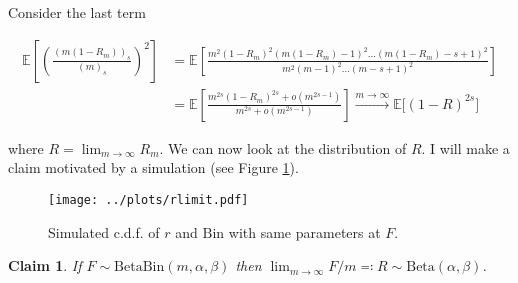 \documentclass[american, abstract=on]{scrartcl}
\theoremstyle{plain}
\newtheorem{claim}{Claim}
\newcommand{\E}{\mathbb{E}}
\newcommand{\Beta}{\text{Beta}}
\newcommand{\Bin}{\text{Bin}}
\begin{document}
Consider the last term

\begin{equation}
    \begin{split}
        \E\left[\left(\frac{(m(1- R_m))_s}{(m)_s} \right)^2\right] &= \E\left[ \frac{m^2 (1 - R_m)^2 (m (1 - R_m) - 1)^2 \ldots (m(1-R_m) - s + 1)^2}{m^2 (m - 1)^2 \ldots (m - s + 1)^2} \right] \\
        &= \E\left[\frac{m^{2s}(1- R_m)^{2s} + o(m^{2s - 1})}{m^{2s} + o(m^{2s - 1})}\right] \xrightarrow{m \rightarrow \infty} \E\Big[ (1 - R)^{2s} \Big]
    \end{split}
\end{equation}

where $R = \lim_{m \rightarrow \infty} R_m$. We can now look at the distribution of $R$. I will make a claim motivated by a simulation (see Figure \ref{fig:rdist}).


\begin{figure}[H]
    \centering
    \texttt{[image: ../plots/rlimit.pdf]} 
    \caption{Simulated c.d.f. of $r$ and $\Bin$ with same parameters at $F$.}
    \label{fig:rdist}    
\end{figure}

\begin{claim}
    If $F \sim \Beta\Bin(m, \alpha, \beta)$ then $\lim_{m \rightarrow \infty} F / m \eqqcolon R \sim \Beta(\alpha, \beta)$.
\end{claim}
\end{document}

